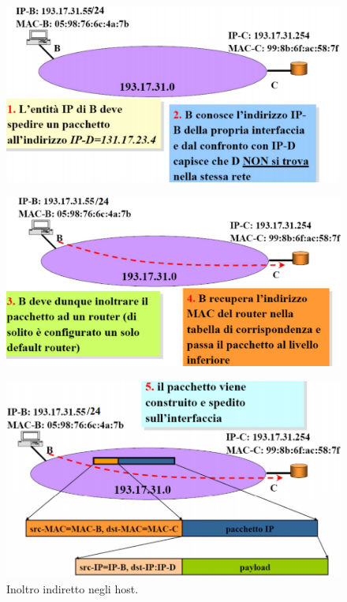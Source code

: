 \documentclass[11pt,a4paper,oneside]{book}
\theoremstyle{definition}
\begin{document}
\pagebreak

\begin{figure}[!h]
	\includegraphics[scale=0.3]{Immagini/Ip_indir.png}
	\centering
\end{figure}\begin{figure}[!h]
	\includegraphics[scale=0.3]{Immagini/Ip_indir1.png}
	\centering
\end{figure}\begin{figure}[!h]
	\includegraphics[scale=0.32]{Immagini/Ip_indir2.png}
	\centering
	\caption{Inoltro indiretto negli host.}
\end{figure}
\end{document}
